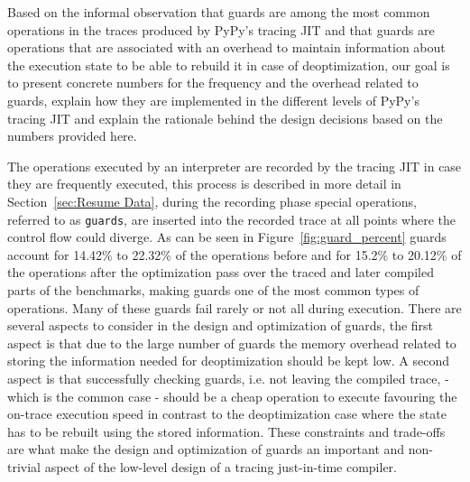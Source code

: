 \documentclass[10pt,preprint]{sigplanconf}
\begin{document}
Based on the informal observation that guards are among the most common
operations in the traces produced by PyPy's tracing JIT and that guards are
operations that are associated with an overhead to maintain information about
the execution state to be able to rebuild it in case of deoptimization, our
goal is to present concrete numbers for the frequency and the overhead related
to guards, explain how they are implemented in the different levels of PyPy's
tracing JIT and explain the rationale behind the design decisions based on the
numbers provided here.

The operations executed by an interpreter are recorded by the tracing JIT in
case they are frequently executed, this process is described in more detail in
Section~\ref{sec:Resume Data}, during the recording phase special operations,
referred to as \texttt{guards}, are inserted into the recorded trace at all
points where the control flow could diverge. As can be seen in
Figure~\ref{fig:guard_percent} guards account for 14.42\% to 22.32\% of the
operations before and for 15.2\% to 20.12\% of the operations after the
optimization pass over the traced and later compiled parts of the benchmarks,
making guards one of the most common types of operations. Many of these guards
fail rarely or not all during execution. There are several aspects to consider
in the design and optimization of guards, the first aspect is that due to the
large number of guards the memory overhead related to storing the information
needed for deoptimization should be kept low. A second aspect is that
successfully checking guards, i.e. not leaving the compiled trace,  - which is
the common case - should be a cheap operation to execute favouring the on-trace
execution speed in contrast to the deoptimization case where the state has to
be rebuilt using the stored information. These constraints and trade-offs are
what make the design and optimization of guards an important and non-trivial
aspect of the low-level design of a tracing just-in-time compiler.
\end{document}
